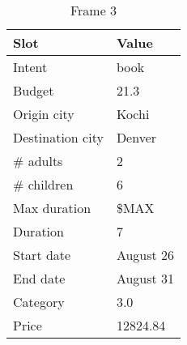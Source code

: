 \begin{table}
    \vspace{\baselineskip}
    \begin{subtable}[t]{\textwidth}
        \centering
        \caption{Frame 3}
        \begin{tabular}[t]{ll}
            \toprule
            Slot & Value \\
            \midrule
            Intent & book \\
            Budget & 21.3 \\
            Origin city & Kochi \\
            Destination city & Denver \\
            \# adults & 2 \\
            \# children & 6 \\
            Max duration & \$MAX \\
            Duration & 7 \\
            Start date & August 26 \\
            End date & August 31 \\
            Category & 3.0 \\
            Price & 12824.84 \\
            \bottomrule
        \end{tabular}
    \end{subtable}
\end{table}


